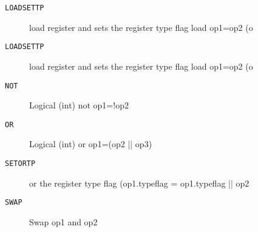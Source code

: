 
\begin{description}
\item[\texttt{LOADSETTP  }]  load register and sets the register type flag load op1=op2 (o\\
\end{description}

\begin{description}
\item[\texttt{LOADSETTP  }]  load register and sets the register type flag load op1=op2 (o\\
\end{description}

\begin{description}
\item[\texttt{NOT        }]  Logical (int) not op1=!op2\\
\end{description}

\begin{description}
\item[\texttt{OR         }]  Logical (int) or op1=(op2 || op3)\\
\end{description}

\begin{description}
\item[\texttt{SETORTP    }]  or the register type flag (op1.typeflag = op1.typeflag || op2\\
\end{description}

\begin{description}
\item[\texttt{SWAP       }]  Swap op1 and op2\\
\end{description}

